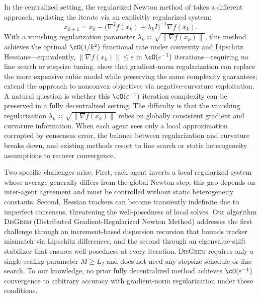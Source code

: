 \documentclass[review,onefignum,onetabnum]{siamart171218}
\begin{document}
In the centralized setting, the regularized Newton method of
\citet{mishchenko2023rn} takes a different approach, updating
the iterate via an explicitly regularized system:
\[
x_{k+1} = x_k - \bigl(\nabla^2 f(x_k) + \lambda_k I\bigr)^{-1} \nabla f(x_k).
\]
With a vanishing regularization parameter
$\lambda_k\asymp\sqrt{\|\nabla f(x_k)\|}$, this method achieves
the optimal $\cO(1/k^2)$ functional rate under convexity
and Lipschitz Hessians---equivalently,
$\|\nabla f(x_k)\|\le\varepsilon$ in $\cO(\varepsilon^{-1})$
iterations---requiring no line search or stepsize tuning.
\citet{doikov2024gradient} show that gradient-norm regularization
can replace the more expensive cubic model
\citep{nesterov2006cubic,cartis2011arc} while preserving the
same complexity guarantees;
\citet{gratton2023nonconvex} extend the approach to nonconvex
objectives via negative-curvature exploitation.
A natural question is whether this $\cO(\varepsilon^{-1})$ iteration complexity can be preserved in a fully decentralized setting.
The difficulty is that the vanishing regularization
$\lambda_k\asymp\sqrt{\|\nabla f(x_k)\|}$ relies on globally
consistent gradient and curvature information.
When each agent sees only a local approximation corrupted
by consensus error, the balance between regularization and curvature
breaks down, and existing methods resort to line search or static
heterogeneity assumptions to recover convergence.

Two specific challenges arise.
First, each agent inverts a local regularized system whose
average generally differs from the global Newton step; this gap
depends on inter-agent agreement and must be controlled without
static heterogeneity constants.
Second, Hessian trackers can become transiently indefinite due to
imperfect consensus, threatening the well-posedness of local solves.
Our algorithm \textsc{DisGrem} (Distributed Gradient-Regularized
Newton Method) addresses the first challenge through an increment-based
dispersion recursion that bounds tracker mismatch via Lipschitz
differences, and the second through an eigenvalue-shift
stabilizer that ensures well-posedness at every iteration.
\textsc{DisGrem} requires only a single scaling parameter $M\ge L_2$
and does not need any stepsize schedule or line search.
To our knowledge, no prior fully decentralized method achieves
$\cO(\varepsilon^{-1})$ convergence to arbitrary accuracy
with gradient-norm regularization under these conditions.
\end{document}
